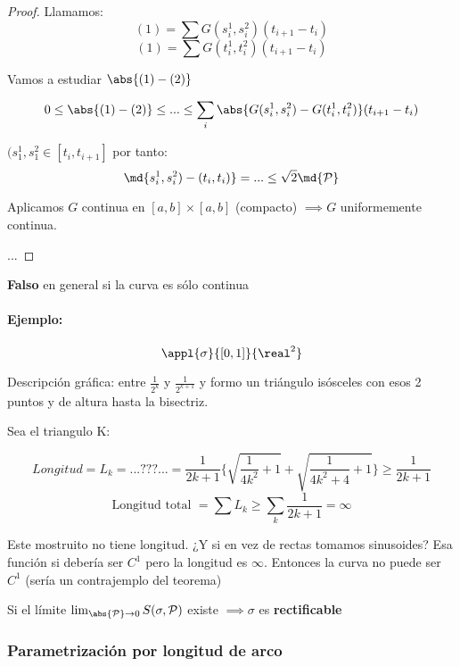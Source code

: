 \begin{proof}
Llamamos:
\[(1) = \sum G(s_i^1,s_i^2)(t_{i+1}-t_i)\]
\[(1) = \sum G(t_i^1,t_i^2)(t_{i+1}-t_i)\]

Vamos a estudiar $\abs{(1)-(2)}$

\[0\leq \abs{(1)-(2)} \leq ... \leq \sum_i \abs{G(s_i^1,s_i^2)- G(t_i^1,t_i^2)}(t_{i+1}-t_i)\]

$(s_1^1, s_1^2 \in [t_i,t_{i+1}]$ por tanto:
\[\md{s_i^1,s_i^2) - (t_i,t_i)} = ... \leq \sqrt{2}\md{\mathcal{P}}\]

Aplicamos $G$ continua en $[a,b]\times [a,b]$ (compacto) $\implies G$ uniformemente continua.

...

\end{proof}

\obs \textbf{Falso} en general si la curva es sólo continua

\paragraph{Ejemplo:}

\[\appl{\sigma}{[0,1]}{\real^2}\]


Descripción gráfica: entre $\frac{1}{2^k}$ y $\frac{1}{2^{k+1}}$ y formo un triángulo isósceles con esos 2 puntos y de altura hasta la bisectriz.

Sea el triangulo K:


\[Longitud =L_k = ... ??? ... = \frac{1}{2k+1} \{\sqrt{\frac{1}{4k^2}+1} + \sqrt{\frac{1}{4k^2+4} +1} \} \ge \frac{1}{2k+1}\]
\[\text{Longitud total } = \sum L_k \ge \sum_k \frac{1}{2k+1} = \infty\]

Este mostruito no tiene longitud. ¿Y si en vez de rectas tomamos sinusoides? Esa función si debería ser $C^1$ pero la longitud es $\infty$. Entonces la curva no puede ser $C^1$ (sería un contrajemplo del teorema)

\begin{defn}
Si el límite $\lim_{\abs{\mathcal{P}}\rightarrow 0} S(\sigma,\mathcal{P}) $ existe $\implies \sigma$ es \textbf{rectificable}
\end{defn}


\subsubsection{Parametrización por longitud de arco}

